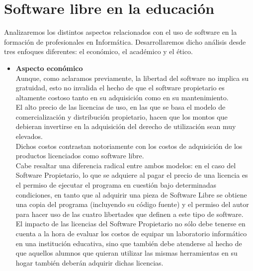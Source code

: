\section{Software libre en la educación}

Analizaremos los distintos aspectos relacionados con el uso de software en la formación de profesionales en Informática. Desarrollaremos dicho análisis desde tres enfoques diferentes: el económico, el académico y el ético.

\begin{itemize}

\item {\bf Aspecto económico}\\
Aunque, como aclaramos previamente, la libertad del software no implica su gratuidad, esto no invalida el hecho de que el software propietario es altamente costoso tanto en su adquisición como en su mantenimiento.\\
El alto precio de las licencias de uso, en las que se basa el modelo de comercialización y distribución propietario, hacen que los montos que debieran invertirse en la adquisición del derecho de utilización sean muy elevados.\\
Dichos costos contrastan notoriamente con los costos de adquisición de los productos licenciados como software libre.\\ 
Cabe resaltar una diferencia radical entre ambos modelos: en el caso del Software Propietario, lo que se adquiere al pagar el precio de una licencia es el permiso de ejecutar el programa en cuestión bajo determinadas condiciones, en tanto que al adquirir una pieza de Software Libre se obtiene una copia del programa (incluyendo su código fuente) y el permiso del autor para hacer uso de las cuatro libertades que definen a este tipo de software. \\
El impacto de las licencias del Software Propietario no sólo debe tenerse en cuenta a la hora de evaluar los costos de equipar un laboratorio informático en una institución educativa, sino que también debe atenderse al hecho de que aquellos alumnos que quieran utilizar las mismas herramientas en su hogar también deberán adquirir dichas licencias. 


\end{itemize}
